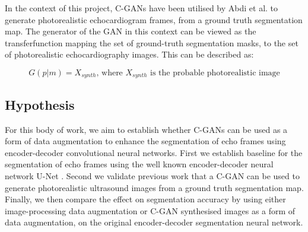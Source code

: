 In the context of this project, C-GANs have been utilised by Abdi et al.
\cite{abdiGANenhancedConditionalEchocardiogram2019} to generate photorealistic
echocardiogram frames, from a ground truth segmentation map. The generator of
the GAN in this context can be viewed as the transferfunction mapping the set of
ground-truth segmentation masks, to the set of photorealistic echocardiography
images. This can be described as: \newline

\begin{equation}
    G(p|m) = X_{synth} \text{, where $X_{synth}$ is the probable photorealistic image}
\end{equation} \newline

\subsection{Hypothesis}

For this body of work, we aim to establish whether C-GANs can be used as a form
of data augmentation to enhance the segmentation of echo frames using
encoder-decoder convolutional neural networks. First we establish baseline for
the segmentation of echo frames using the well known encoder-decoder neural
network U-Net \cite{ronneberger2015u}. Second we validate previous work that a C-GAN can be used to
generate photorealistic ultrasound images from a ground truth segmentation map.
Finally, we then compare the effect on segmentation accuracy by using either
image-processing data augmentation or C-GAN synthesised images as a form of data
augmentation, on the original encoder-decoder segmentation neural network. \newline